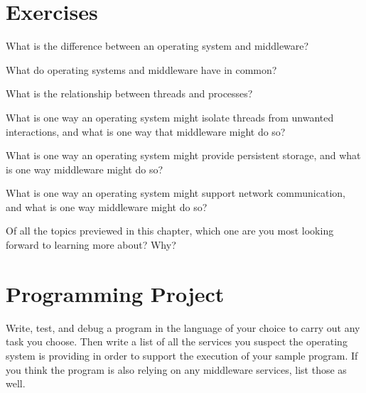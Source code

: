 \section*{Exercises}

\begin{chapterEnumerate}
\item
What is the difference between an operating system and middleware?
\item
What do operating systems and middleware have in common?
\item
What is the relationship between threads and processes?
\item
What is one way an operating system might isolate threads from
unwanted interactions, and what is one way that middleware might do so?
\item
What is one way an operating system might provide persistent storage,
and what is one way middleware might do so?
\item
What is one way an operating system might support network
communication, and what is one way middleware might do so?
\item
Of all the topics previewed in this chapter, which one are you most
looking forward to learning more about?  Why?
\end{chapterEnumerate}

\section*{Programming Project}
\begin{chapterEnumerate}
\item
Write, test, and debug a program in the language of your choice to
carry out any task you choose.  Then write a list of all the services
you suspect the operating system is providing in order to support the
execution of your sample program.  If you think the program is also
relying on any middleware services, list those as well.
\end{chapterEnumerate}

